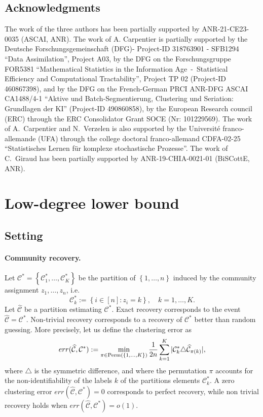 \documentclass[final]{colt2026}
\newcommand{\1}{\mathbf{1}}
\newcommand{\pa}[1]{\left(#1\right)}
\newcommand{\ac}[1]{\left\{#1\right\}}
\begin{document}
\subsection*{Acknowledgments}
The work of the  three authors has  been partially supported by ANR-21-CE23-0035 (ASCAI, ANR).
The work of A. Carpentier is partially supported by the Deutsche Forschungsgemeinschaft (DFG)- Project-ID 318763901 - SFB1294 ``Data Assimilation'', Project A03,  by the DFG on the Forschungsgruppe FOR5381 ``Mathematical Statistics in the Information Age~-~Statistical Efficiency and Computational Tractability'', Project TP 02 (Project-ID 460867398), and by  the DFG on the French-German PRCI ANR-DFG ASCAI CA1488/4-1 ``Aktive und Batch-Segmentierung, Clustering und Seriation: Grundlagen der KI'' (Project-ID 490860858), by the European Research council (ERC) through the ERC Consolidator Grant SOCE (Nr: 101229569).  The work of A.~Carpentier and N.~Verzelen is also supported by the Universit\'e franco-allemande (UFA) through the college doctoral franco-allemand CDFA-02-25 ``Statistisches Lernen für komplexe stochastische Prozesse''. The work of C.~Giraud has been partially supported by ANR-19-CHIA-0021-01 (BiSCottE, ANR).




\appendix
\section{Low-degree lower bound}\label{sec:main}


\subsection{Setting}\label{sec:setting}



\paragraph{Community recovery.}
Let $\mathcal{C}^*=\ac{\mathcal{C}^*_{1},\ldots,\mathcal{C}^*_{K}}$ be the partition of $\ac{1,\ldots,n}$ induced by the community assignment $z_{1},\ldots,z_{n}$, i.e.
$$\mathcal{C}^*_{k}:=\ac{i\in [n]:z_{i}=k},\quad k=1,\ldots,K.$$
Let $\widehat{\mathcal{C}}$ be a partition estimating $\mathcal{C}^*$. Exact recovery corresponds to the event $\widehat{\mathcal{C}}=\mathcal{C}^*$. Non-trivial recovery corresponds to a recovery of $\mathcal{C}^*$ better than random guessing. More precisely, let us define the clustering error as
$$err(\widehat{\mathcal{C}},\mathcal{C}^*) := \min_{\pi \in \mathrm{Perm}\pa{\ac{1,\ldots,K}}} {1\over 2n} \sum_{k=1}^K |\mathcal{C}^*_{k}\triangle \widehat{\mathcal{C}}_{\pi(k)}|,$$
where $\triangle$ is the symmetric difference, and
where the permutation $\pi$ accounts for the non-identifiability of the labels $k$ of the partitions elements $\mathcal{C}^*_{k}$. 
A zero clustering  error $err(\widehat{\mathcal{C}},\mathcal{C}^*)=0$ corresponds to perfect recovery, while non trivial recovery holds when $err(\widehat{\mathcal{C}},\mathcal{C}^*)=o(1)$. 
\end{document}

